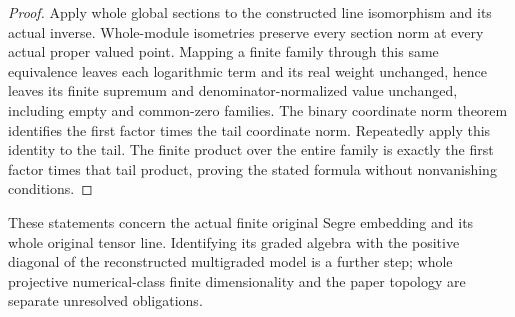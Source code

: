 \begin{proof}
Apply whole global sections to the constructed line isomorphism and its
actual inverse. Whole-module isometries preserve every section norm at
every actual proper valued point. Mapping a finite family through this
same equivalence leaves each logarithmic term and its real weight
unchanged, hence leaves its finite supremum and denominator-normalized
value unchanged, including empty and common-zero families. The binary
coordinate norm theorem identifies the first factor times the tail
coordinate norm. Repeatedly apply this identity to the tail. The finite
product over the entire family is exactly the first factor times that
tail product, proving the stated formula without nonvanishing conditions.
\end{proof}
These statements concern the actual finite original Segre embedding and
its whole original tensor line. Identifying its graded algebra with the
positive diagonal of the reconstructed multigraded model is a further
step; whole projective numerical-class finite dimensionality and the
paper topology are separate unresolved obligations.
